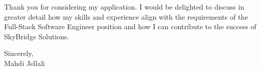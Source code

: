 \documentclass[letterpaper,11pt]{article}
\begin{document}
    Thank you for considering my application. I would be delighted to discuss in greater detail how my skills and experience align with the requirements of the Full-Stack Software Engineer position and how I can contribute to the success of SkyBridge Solutions.

    Sincerely,\\[12pt]

    Mahdi Jellali
\end{document}
